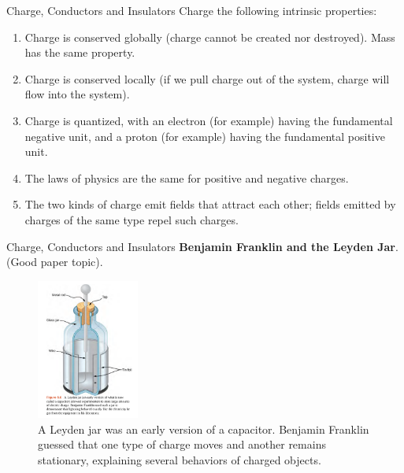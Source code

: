 \documentclass{beamer}
\begin{document}
\begin{frame}{Charge, Conductors and Insulators}
\small
Charge the following intrinsic properties: \\ \vspace{0.25cm}
\begin{enumerate}
\item Charge is conserved globally (charge cannot be created nor destroyed).  Mass has the same property.
\item Charge is conserved locally (if we pull charge out of the system, charge will flow into the system).
\item Charge is quantized, with an electron (for example) having the fundamental negative unit, and a proton (for example) having the fundamental positive unit.
\item The laws of physics are the same for positive and negative charges.
\item The two kinds of charge emit fields that attract each other; fields emitted by charges of the same type repel such charges.
\end{enumerate}
\end{frame}

\begin{frame}{Charge, Conductors and Insulators}
\textbf{Benjamin Franklin and the Leyden Jar}.  (Good paper topic).
\begin{figure}
\centering
\includegraphics[width=0.3\textwidth]{figures/leyden.png}
\caption{\label{fig:leyden} A Leyden jar was an early version of a capacitor.  Benjamin Franklin guessed that one type of charge moves and another remains stationary, explaining several behaviors of charged objects.}
\end{figure}
\end{frame}
\end{document}
